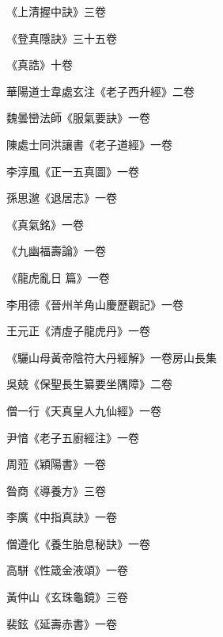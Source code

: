 \begin{pinyinscope}
 《上清握中訣》三卷



 《登真隱訣》三十五卷



 《真誥》十卷



 華陽道士韋處玄注《老子西升經》二卷



 魏曇巒法師《服氣要訣》一卷



 陳處士同洪讓書《老子道經》一卷



 李淳風《正一五真圖》一卷



 孫思邈《退居志》一卷



 《真氣銘》一卷



 《九幽福壽論》一卷



 《龍虎亂日
 篇》一卷



 李用德《晉州羊角山慶歷觀記》一卷



 王元正《清虛子龍虎丹》一卷



 《驪山母黃帝陰符大丹經解》一卷房山長集



 吳兢《保聖長生纂要坐隅障》二卷



 僧一行《天真皇人九仙經》一卷



 尹愔《老子五廚經注》一卷



 周蒞《穎陽書》一卷



 昝商《導養方》三卷



 李廣《中指真訣》一卷



 僧遵化《養生胎息秘訣》一卷



 高駢《性箴金液頌》一卷



 黃仲山《玄珠龜鏡》三卷



 裴鉉《延壽赤書》一卷




\end{pinyinscope}
